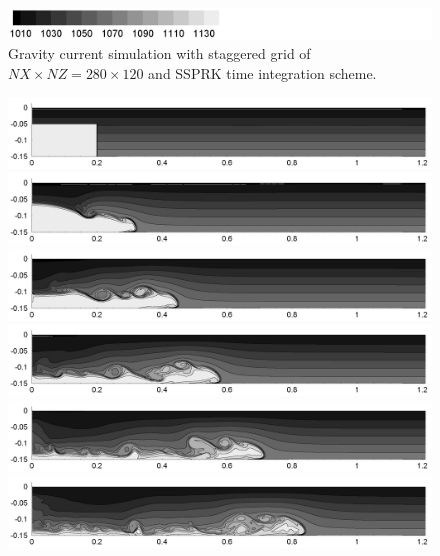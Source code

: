 \begin{figure}[htbp]
\begin{center}
\includegraphics[scale=0.55]{../figures/Staggered/Fig9case/label.png}
    \caption{Gravity current simulation with staggered grid of $NX \times NZ = 280 \times 120$ and SSPRK time integration scheme.}
    \label{fig:060518c-SSPRK35-dt-00375-280-120}
  \end{center}
\end{figure}


\begin{figure}[htbp]
  \begin{center}    \includegraphics[scale=0.55]{../figures/Staggered/Fig9case/060526a-560-240-00375-VE-6/01.png}    \includegraphics[scale=0.55]{../figures/Staggered/Fig9case/060526a-560-240-00375-VE-6/02.png}
\includegraphics[scale=0.55]{../figures/Staggered/Fig9case/060526a-560-240-00375-VE-6/03.png}
\includegraphics[scale=0.55]{../figures/Staggered/Fig9case/060526a-560-240-00375-VE-6/04.png}    \includegraphics[scale=0.55]{../figures/Staggered/Fig9case/060526a-560-240-00375-VE-6/05.png}
\includegraphics[scale=0.55]{../figures/Staggered/Fig9case/060526a-560-240-00375-VE-6/06.png}

\end{center}
\end{figure}
